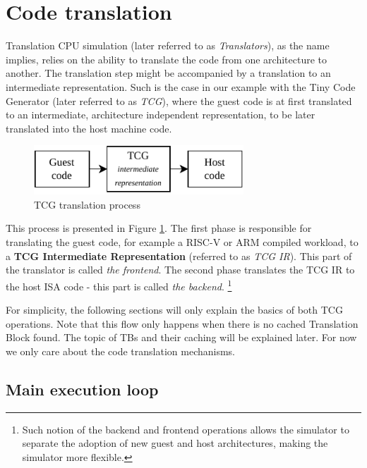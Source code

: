 \section{Code translation}

Translation CPU simulation (later referred to as \textit{Translators}), as the name implies, relies on the ability to
translate the code from one architecture to another. The translation step might be accompanied by a translation to an
intermediate representation. Such is the case in our example with the Tiny Code Generator (later referred to as
\textit{TCG}), where the guest code is at first translated to an intermediate, architecture independent representation,
to be later translated into the host machine code.

\pagebreak

\begin{figure}[h]
	\centering
	\vspace{10px}
	\includegraphics[height=70px]{figures/Translation_Guest-TCG-Host.pdf}
	\caption{TCG translation process}
    \label{fig:tcg}
\end{figure}

\noindent
This process is presented in Figure \ref{fig:tcg}. The first phase is responsible for translating the guest code, for example a RISC-V or ARM compiled
workload, to a \textbf{TCG Intermediate Representation} (referred to as \textit{TCG IR}). This part of the translator is
called \textit{the frontend}. The second phase translates the TCG IR to the host ISA code - this part is called
\textit{the backend}.%
\footnote{Such notion of the backend and frontend operations allows the simulator to separate the adoption
of new guest and host architectures, making the simulator more flexible.}

For simplicity, the following sections will only explain the basics of both TCG operations.
Note that this flow only happens when there is no cached Translation Block found. The topic of TBs and
their caching will be explained later. For now we only care about the code translation mechanisms.

\subsection{Main execution loop}

